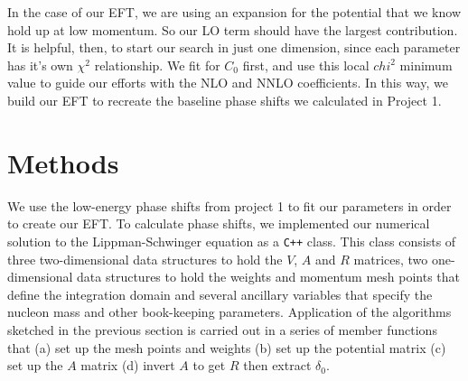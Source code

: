 \documentclass[10pt,showpacs,preprintnumbers,footinbib,amsmath,amssymb,aps,prl,twocolumn,groupedaddress,superscriptaddress,showkeys]{revtex4-1}
\begin{document}
In the case of our EFT, we are using an expansion for the potential that we know hold up at low
momentum. So our LO term should have the largest contribution. It is helpful, then, to start our
search in just one dimension, since each parameter has it's own $\chi^2$ relationship. We fit for
$C_0$ first, and use this local $chi^2$ minimum value to guide our efforts with the NLO and
NNLO coefficients. In this way, we build our EFT to recreate the baseline phase shifts we
calculated in Project 1. 






\section{Methods}

We use the low-energy phase shifts from project 1 to fit our parameters in order to create our EFT. 
To calculate phase shifts, we implemented our numerical solution to the Lippman-Schwinger equation
as a \texttt{C++} class. This class consists of three two-dimensional data structures to hold the
$V$, $A$ and $R$ matrices, two one-dimensional data structures to hold the weights and momentum
mesh points that define the integration domain and several ancillary variables that specify the nucleon
mass and other book-keeping parameters. Application of the algorithms sketched in the previous
section is carried out in a series of member functions that (a) set up the mesh points and weights (b)
set up the potential matrix (c) set up the $A$ matrix (d) invert $A$ to get $R$ then extract $\delta _0$. 
\end{document}
